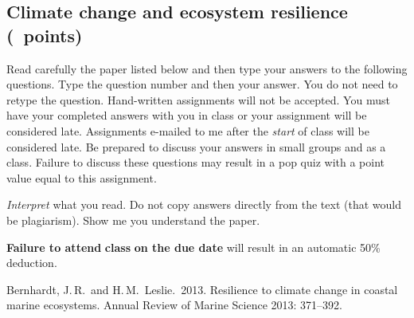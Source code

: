 \documentclass[12pt, addpoints]{exam}
\begin{document}
\subsection*{Climate change and ecosystem resilience (\numpoints\ points)}

Read carefully the paper listed below and then type your answers to the following questions.
Type the question number and then your answer. You do not need to retype the question. Hand-written
assignments will not be accepted. You must have your completed answers
with you in class or your assignment will be considered late. Assignments e-mailed to me after the \emph{start} of class will be
considered late. Be prepared to discuss your answers in small groups and as a class. Failure
to discuss these questions may result in a pop quiz with a point value
equal to this assignment.

\emph{Interpret} what you read. Do not copy answers directly from the text (that would
be plagiarism). Show me you understand the paper.

\textbf{Failure to attend} \textbf{class} \textbf{on the due date} will
result in an automatic 50\% deduction.

\begin{hangparas}{1.5em}{1}
Bernhardt, J.\,R.~and H.\,M.~Leslie.~2013. Resilience to climate change in 
coastal marine ecosystems. Annual Review of Marine Science 2013: 371--392.

\end{hangparas}
\end{document}
